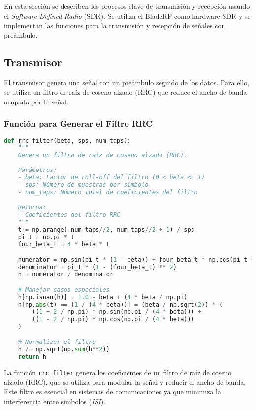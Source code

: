 \documentclass[letterpaper,12pt,oneside]{article}
\begin{document}
En esta sección se describen los procesos clave de transmisión y recepción usando el \textit{Software Defined Radio} (SDR). Se utiliza el BladeRF como hardware SDR y se implementan las funciones para la transmisión y recepción de señales con preámbulo.

\subsection{Transmisor}
El transmisor genera una señal con un preámbulo seguido de los datos. Para ello, se utiliza un filtro de raíz de coseno alzado (RRC) que reduce el ancho de banda ocupado por la señal.

\subsubsection*{Función para Generar el Filtro RRC}
\begin{tcolorbox}[title=\textbf{Generación del Filtro Raíz de Coseno Alzado (RRC)}, colframe=black, colback=white]
\begin{lstlisting}[language=Python]
def rrc_filter(beta, sps, num_taps):
    """
    Genera un filtro de raíz de coseno alzado (RRC).
    
    Parámetros:
    - beta: Factor de roll-off del filtro (0 < beta <= 1)
    - sps: Número de muestras por símbolo
    - num_taps: Número total de coeficientes del filtro

    Retorna:
    - Coeficientes del filtro RRC
    """
    t = np.arange(-num_taps//2, num_taps//2 + 1) / sps
    pi_t = np.pi * t
    four_beta_t = 4 * beta * t

    numerator = np.sin(pi_t * (1 - beta)) + four_beta_t * np.cos(pi_t * (1 + beta))
    denominator = pi_t * (1 - (four_beta_t) ** 2)
    h = numerator / denominator

    # Manejar casos especiales
    h[np.isnan(h)] = 1.0 - beta + (4 * beta / np.pi)
    h[np.abs(t) == (1 / (4 * beta))] = (beta / np.sqrt(2)) * (
        ((1 + 2 / np.pi) * np.sin(np.pi / (4 * beta))) +
        ((1 - 2 / np.pi) * np.cos(np.pi / (4 * beta)))
    )

    # Normalizar el filtro
    h /= np.sqrt(np.sum(h**2))
    return h
\end{lstlisting}
\end{tcolorbox}

La función \texttt{rrc\_filter} genera los coeficientes de un filtro de raíz de coseno alzado (RRC), que se utiliza para modular la señal y reducir el ancho de banda. Este filtro es esencial en sistemas de comunicaciones ya que minimiza la interferencia entre símbolos (\textit{ISI}).
\end{document}
